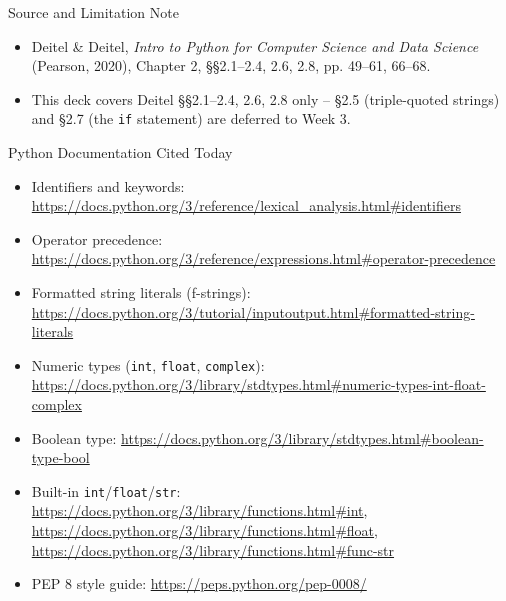 \documentclass{beamer}
\begin{document}
\begin{frame}{Source and Limitation Note}
\begin{itemize}
    \item Deitel \& Deitel, \emph{Intro to Python for Computer Science and Data Science} (Pearson, 2020), Chapter 2, \S\S2.1--2.4, 2.6, 2.8, pp. 49--61, 66--68.
    \item This deck covers Deitel \S\S2.1--2.4, 2.6, 2.8 only -- \S2.5 (triple-quoted strings) and \S2.7 (the \texttt{if} statement) are deferred to Week 3.
\end{itemize}
\end{frame}

\begin{frame}[allowframebreaks]{Python Documentation Cited Today}
\small
\begin{itemize}
    \item Identifiers and keywords: \url{https://docs.python.org/3/reference/lexical_analysis.html\#identifiers}
    \item Operator precedence: \url{https://docs.python.org/3/reference/expressions.html\#operator-precedence}
    \item Formatted string literals (f-strings): \url{https://docs.python.org/3/tutorial/inputoutput.html\#formatted-string-literals}
    \item Numeric types (\texttt{int}, \texttt{float}, \texttt{complex}): \url{https://docs.python.org/3/library/stdtypes.html\#numeric-types-int-float-complex}
    \item Boolean type: \url{https://docs.python.org/3/library/stdtypes.html\#boolean-type-bool}
    \item Built-in \texttt{int}/\texttt{float}/\texttt{str}: \url{https://docs.python.org/3/library/functions.html\#int}, \url{https://docs.python.org/3/library/functions.html\#float}, \url{https://docs.python.org/3/library/functions.html\#func-str}
    \item PEP 8 style guide: \url{https://peps.python.org/pep-0008/}
\end{itemize}
\end{frame}
\end{document}
